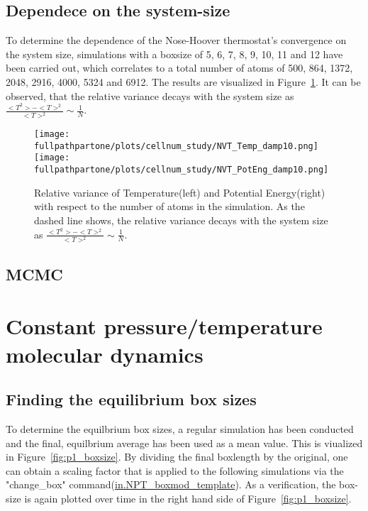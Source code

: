 \documentclass[10pt,a4paper]{report}
\def \pathpartone {../../1_three-dimensional_atomic_system}
\def \fullpathpartone {/home/lukas/Desktop/project/independence/atomistic_modeling/exam/1_three-dimensional_atomic_system}
\begin{document}
\subsection{Dependece on the system-size}
To determine the dependence of the Nose-Hoover thermostat's convergence on the system size, simulations with a boxsize of 5, 6, 7, 8, 9, 10, 11 and 12 have been carried out, which correlates to a total number of atoms of 500, 864, 1372, 2048, 2916, 4000, 5324 and 6912. The results are visualized in Figure~\ref{fig:p1_cellnum_study}. It can be observed, that the relative variance decays with the system size as $\frac{<T^2>-<T>^2}{<T>^2}\sim\frac{1}{N}$.

\begin{center}
\begin{figure}[h]
\texttt{[image: \\fullpathpartone/plots/cellnum\_study/NVT\_Temp\_damp10.png]}
\texttt{[image: \\fullpathpartone/plots/cellnum\_study/NVT\_PotEng\_damp10.png]}
\caption[aaa]{Relative variance of Temperature(left) and Potential Energy(right) with respect to the number of atoms in the simulation. As the dashed line shows, the relative variance decays with the system size as $\frac{<T^2>-<T>^2}{<T>^2}\sim\frac{1}{N}$.}
\label{fig:p1_cellnum_study}
\end{figure}
\end{center}


\subsection{MCMC}







\section{Constant pressure/temperature molecular dynamics}
\subsection{Finding the equilibrium box sizes}
To determine the equilbrium box sizes, a regular simulation has been conducted and the final, equilbrium average has been used as a mean value. This is viualized in Figure~\ref{fig:p1_boxsize}. By dividing the final boxlength by the original, one can obtain a scaling factor that is applied to the following simulations via the "change\_box" command(\href{\pathpartone/in.NPT_boxmod_template}{in.NPT\_boxmod\_template}).
As a verification, the box-size is again plotted over time in the right hand side of Figure~\ref{fig:p1_boxsize}.\\
\end{document}
